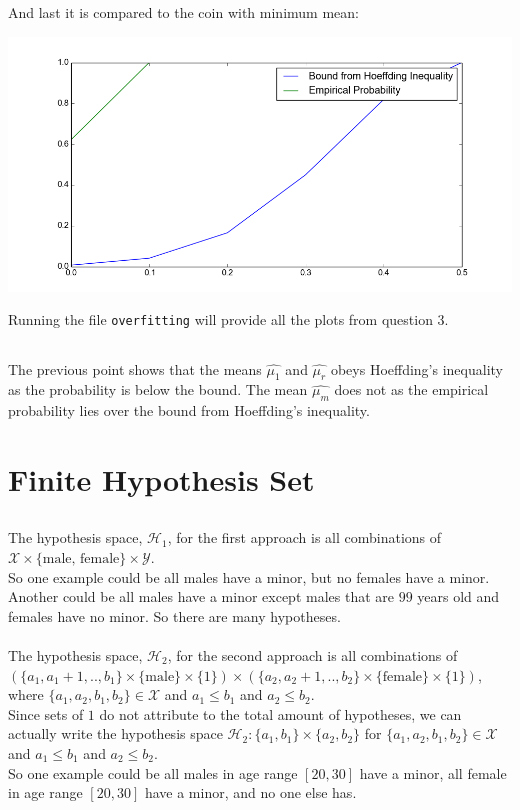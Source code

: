 \documentclass[a4paper]{article}
\begin{document}
And last it is compared to the coin with minimum mean:
\begin{center}
	\includegraphics[scale=0.5]{hoef3}
\end{center}
Running the file \texttt{overfitting} will provide all the plots from question $3$.

\subsection{}
The previous point shows that the means $\hat{\mu_1}$ and $\hat{\mu_r}$ obeys Hoeffding's inequality as the probability is below the bound. The mean $\hat{\mu_m}$ does not as the empirical probability lies over the bound from Hoeffding's inequality.


\section{Finite Hypothesis Set}
\subsection{}
The hypothesis space, $\mathcal{H}_1$, for the first approach is all combinations of $\mathcal{X}\times \{\text{male, female}\}\times \mathcal{Y}$. \\
So one example could be all males have a minor, but no females have a minor. Another could be all males have a minor except males that are $99$ years old and females have no minor. So there are many hypotheses. \\
\\
The hypothesis space, $\mathcal{H}_2$, for the second approach is all combinations of $(\{a_1, a_1+1, .., b_1\} \times \{\text{male}\}\times \{1\})\times (\{a_2, a_2+1, .., b_2\} \times \{\text{female}\}\times \{1\})$, where $\{a_1, a_2, b_1, b_2\}\in \mathcal{X}$ and $a_1\leq b_1$ and $a_2\leq b_2$. \\
Since sets of $1$ do not attribute to the total amount of hypotheses, we can actually write the hypothesis space $\mathcal{H}_2: \{a_1, b_1\}\times \{a_2, b_2\}$ for $\{a_1, a_2, b_1, b_2\}\in \mathcal{X}$ and $a_1\leq b_1$ and $a_2\leq b_2$. \\
So one example could be all males in age range $[20,30]$ have a minor, all female in age range $[20,30]$ have a minor, and no one else has.
\end{document}

